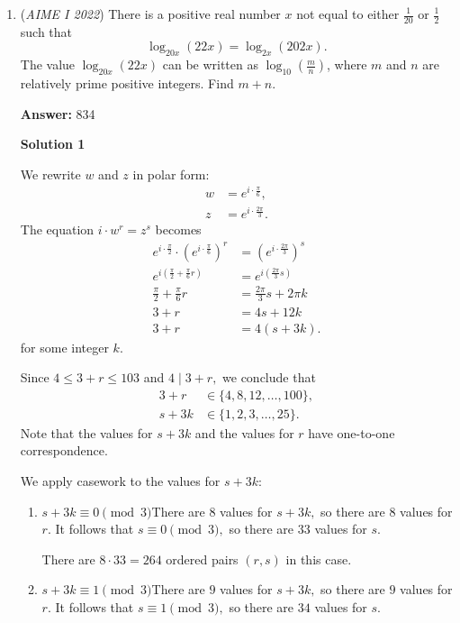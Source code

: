 \begin{enumerate}
 


	\item (\textit{AIME I 2022}) There is a positive real number $x$ not equal to either $\frac{1}{20}$ or $\frac{1}{2}$ such that
 \[\log_{20x} (22x)=\log_{2x} (202x).\]The value $\log_{20x} (22x)$ can be written as $\log_{10} (\frac{m}{n})$, where $m$ and $n$ are relatively prime positive integers. Find $m+n$.


 
 \textbf{Answer: }834



\textbf{Solution 1}

We rewrite $w$ and $z$ in polar form:
 \begin{align*} w &= e^{i\cdot\frac{\pi}{6}}, \\ z &= e^{i\cdot\frac{2\pi}{3}}. \end{align*}
The equation $i \cdot w^r = z^s$ becomes
 \begin{align*} e^{i\cdot\frac{\pi}{2}} \cdot \left(e^{i\cdot\frac{\pi}{6}}\right)^r &= \left(e^{i\cdot\frac{2\pi}{3}}\right)^s \\ e^{i\left(\frac{\pi}{2}+\frac{\pi}{6}r\right)} &= e^{i\left(\frac{2\pi}{3}s\right)} \\ \frac{\pi}{2}+\frac{\pi}{6}r &= \frac{2\pi}{3}s+2\pi k \\ 3+r &= 4s+12k \\ 3+r &= 4(s+3k). \end{align*}
for some integer $k.$ 

 Since $4\leq 3+r\leq 103$ and $4\mid 3+r,$ we conclude that
 \begin{align*} 3+r &\in \{4,8,12,\ldots,100\}, \\ s+3k &\in \{1,2,3,\ldots,25\}. \end{align*}
Note that the values for $s+3k$ and the values for $r$ have one-to-one correspondence.

 We apply casework to the values for $s+3k:$

            \begin{enumerate} 
        \item $s+3k\equiv0\pmod{3}$There are $8$ values for $s+3k,$ so there are $8$ values for $r.$ It follows that $s\equiv0\pmod{3},$ so there are $33$ values for $s.$ 

 There are $8\cdot33=264$ ordered pairs $(r,s)$ in this case.  

 
        \item $s+3k\equiv1\pmod{3}$There are $9$ values for $s+3k,$ so there are $9$ values for $r.$ It follows that $s\equiv1\pmod{3},$ so there are $34$ values for $s.$ 


\end{enumerate}
\end{enumerate}
